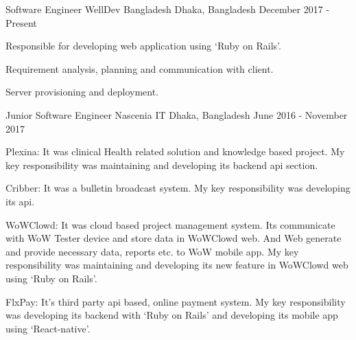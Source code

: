 \begin{cventries}

\cventry
    {Software Engineer}
    {WellDev Bangladesh}
    {Dhaka, Bangladesh}
    {December 2017 - Present}
    {
      \begin{cvitems}[Responsibilities:]
        \item {Responsible for developing web application using ‘Ruby on Rails’.}
        \vspace{1mm}
        \item {Requirement analysis, planning and communication with client.}
        \vspace{1mm}
        \item {Server provisioning and deployment.}
      \end{cvitems}
    }

\cventry
    {Junior Software Engineer}
    {Nascenia IT}
    {Dhaka, Bangladesh}
    {June 2016 - November 2017}
    {
      \begin{cvitems}[Projects:]
        \vspace{1mm}
        \item {Plexina:  It was clinical Health related solution and knowledge based project. My key responsibility was maintaining and developing its backend api section.}
        \vspace{1mm}
        \item {Cribber: It was a bulletin broadcast system. My key responsibility was developing its api.}
        \vspace{1mm}
        \item {WoWClowd: It was cloud based project management system. Its communicate with WoW Tester device and store data in WoWClowd web. And Web generate and provide necessary data, reports etc. to WoW mobile app. My key responsibility was maintaining and developing its new feature in WoWClowd web using  ‘Ruby on Rails’.
        \vspace{1mm}
}
        \item {FlxPay:  It’s third party api based, online payment system. My key responsibility was developing its backend with ‘Ruby on Rails’ and developing its mobile app using ‘React-native’.}
      \end{cvitems}
    }
\end{cventries}
